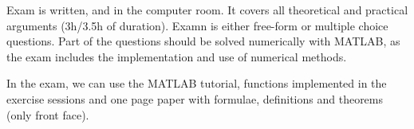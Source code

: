 \documentclass[palatino]{epflnotes}
\begin{document}
Exam is written, and in the computer room. It covers all theoretical and practical arguments (3h/3.5h of duration). Examn is either free-form or multiple choice questions. Part of the questions should be solved numerically with MATLAB, as the exam includes the implementation and use of numerical methods.

In the exam, we can use the MATLAB tutorial, functions implemented in the exercise sessions and one page paper with formulae, definitions and theorems (only front face).

% 


\backmatter

\nocite{scientificComputingMatlab}


\printindex
\end{document}
